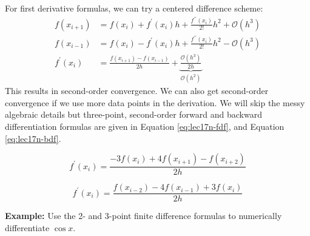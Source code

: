 For first derivative formulas, we can try a centered difference scheme:
\begin{align*}
f(x_{i+1}) &= f(x_i) + f^{\prime}(x_i)h + \frac{f^{\prime \prime}(x_i)}{2!}h^2 + \mathcal{O}(h^3) \\
f(x_{i-1}) &= f(x_i) - f^{\prime}(x_i)h + \frac{f^{\prime \prime}(x_i)}{2!}h^2 - \mathcal{O}(h^3) \\
f^{\prime}(x_i) &= \frac{f(x_{i+1})- f(x_{i-1})}{2h} + \underbrace{\frac{\mathcal{O}(h^3)}{2h}}_{\mathcal{O}(h^2)}
\end{align*}
This results in second-order convergence.  We can also get second-order convergence if we use more data points in the derivation.  We will skip the messy algebraic details but three-point, second-order forward and backward differentiation formulas are given in Equation \ref{eq:lec17n-fdf}, and Equation \ref{eq:lec17n-bdf}.

\begin{equation}
f^{\prime}(x_{i}) = \frac{-3f(x_i) + 4f(x_{i+1}) - f(x_{i+2})}{2h}
\label{eq:lec17n-fdf}
\end{equation}

\begin{equation}
f^{\prime}(x_{i}) = \frac{f(x_{i-2}) - 4f(x_{i-1}) + 3f(x_i)}{2h}
\label{eq:lec17n-bdf}
\end{equation}

\vspace{0.5cm}

\noindent\textbf{Example: } Use the 2- and 3-point finite difference formulas to numerically differentiate $\cos{x}$.  

\vspace{0.1cm}

